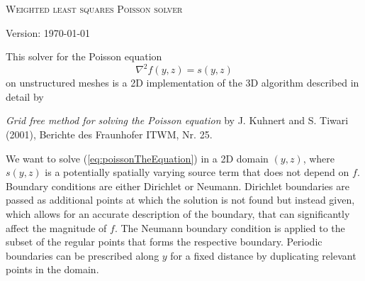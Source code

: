 \documentclass{article}
\begin{document}
	
	\pagestyle{plain}
	



\begin{center}
	\Large
	\textsc{Weighted least squares Poisson solver}
	
	\large
	Version: \today
\end{center}

This solver for the Poisson equation 
\begin{equation} \label{eq:poissonTheEquation}
\nabla^2 f(y,z) = s(y,z)
\end{equation}
on unstructured meshes is a 2D implementation of the 3D algorithm described in detail by

\begin{center}
	\begin{minipage}{0.8\linewidth}
		\emph{Grid free method for solving the Poisson equation} by J. Kuhnert and S. Tiwari (2001), Berichte des Fraunhofer ITWM, Nr. 25.
	\end{minipage}
\end{center}

We want to solve (\ref{eq:poissonTheEquation})
in a 2D domain $(y,z)$,
where $s(y,z)$ is a potentially spatially varying source term that does not depend on $f$. 
Boundary conditions are either Dirichlet or Neumann.
Dirichlet boundaries are passed as additional points at which the solution is not found but instead given,
which allows for an accurate description of the boundary, that can significantly affect the magnitude of $f$.
The Neumann boundary condition is applied to the subset of the regular points that forms the respective boundary.
Periodic boundaries can be prescribed along $y$ for a fixed distance by duplicating relevant points in the domain.
\end{document}

